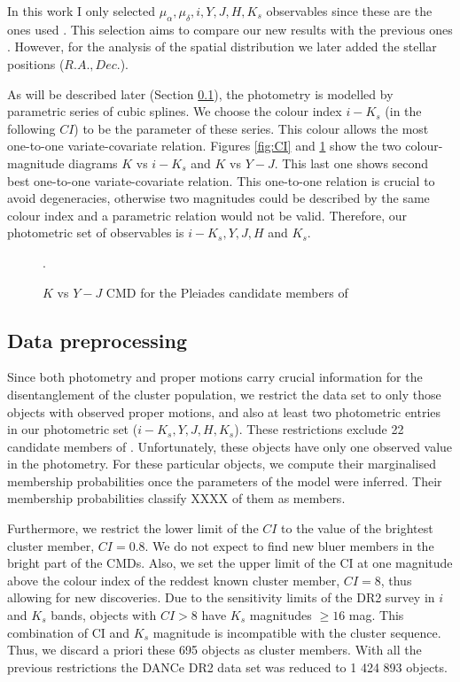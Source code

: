 In this work I only selected $\mu_{\alpha},\mu_{\delta},i,Y,J,H,K_s$ observables since these are the ones used \citet{Bouy2015}. This selection aims to compare our new results with the previous ones \citep{Sarro2014,Bouy2015}. However, for the analysis of the spatial distribution we later added the stellar positions ($R.A., Dec.$).

As will be described later (Section \ref{}), the photometry is modelled by parametric series of cubic splines. We choose the colour index $i-K_s$ (in the following $CI$) to be the parameter of these series. This colour allows the most one-to-one variate-covariate relation. Figures \ref{fig:CI} and \ref{fig:otherCI} show the two colour-magnitude diagrams $K$ vs $i-K_s$ and $K$ vs $Y-J$. This last one shows second best one-to-one variate-covariate relation. This one-to-one relation is crucial to avoid degeneracies, otherwise two magnitudes could be described by the same colour index and a parametric relation would not be valid. Therefore, our photometric set of observables is $i-K_s, Y,J,H$ and $K_s$. 


\begin{figure}[htbp]
\begin{center}
\caption{$K$ vs $Y-J$ CMD for the Pleiades candidate members of \citet{Bouy2015}}.
\label{fig:otherCI}
\end{center}
\end{figure}

\subsection{Data preprocessing}
Since both photometry and proper motions carry crucial information for the disentanglement of the cluster population, we restrict the data set to only those objects with observed proper motions, and also at least two photometric entries in our photometric set ($i-K_s,Y,J,H,K_s$). These restrictions exclude 22 candidate members of \citet{Bouy2015}. Unfortunately, these objects have only one observed value in the photometry. For these particular objects, we compute their marginalised membership probabilities once the parameters of the model were inferred. Their membership probabilities classify XXXX of them as members. 

 Furthermore, we restrict the lower limit of the $CI$ to the value of the brightest cluster member, $CI =0.8$. We do not expect to find new bluer members in the bright part of the CMDs. Also, we set the upper limit of the CI at one magnitude above the colour index of the reddest known cluster member, $CI=8$, thus allowing for new discoveries. Due to the sensitivity limits of the DR2 survey in $i$ and $K_s$ bands, objects with $CI>8$ have $K_s$ magnitudes $\geq 16$ mag. This combination of CI and $K_s$ magnitude is incompatible with the cluster sequence. Thus, we discard a priori these 695 objects as cluster members. With all the previous restrictions the DANCe DR2 data set was reduced to 1 424 893 objects.

